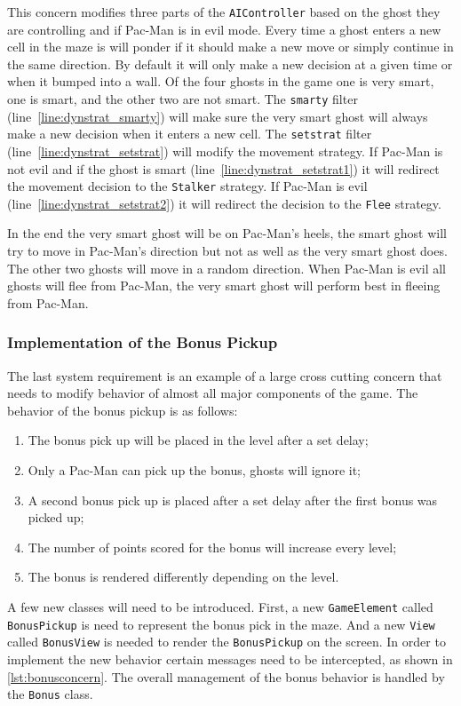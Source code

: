 This concern modifies three parts of the \lstinline|AIController| based on the ghost they are controlling and if Pac-Man is in evil mode. Every time a ghost enters a new cell in the maze is will ponder if it should make a new move or simply continue in the same direction. By default it will only make a new decision at a given time or when it bumped into a wall. Of the four ghosts in the game one is very smart, one is smart, and the other two are not smart. 
The \lstinline|smarty| filter (line~\ref{line:dynstrat_smarty}) will make sure the very smart ghost will always make a new decision when it enters a new cell. The \lstinline|setstrat| filter (line~\ref{line:dynstrat_setstrat}) will modify the movement strategy. If Pac-Man is not evil and if the ghost is smart (line~\ref{line:dynstrat_setstrat1}) it will redirect the movement decision to the \lstinline|Stalker| strategy. If Pac-Man is evil (line~\ref{line:dynstrat_setstrat2}) it will redirect the decision to the \lstinline|Flee| strategy.

In the end the very smart ghost will be on Pac-Man's heels, the smart ghost will try to move in Pac-Man's direction but not as well as the very smart ghost does. The other two ghosts will move in a random direction. When Pac-Man is evil all ghosts will flee from Pac-Man, the very smart ghost will perform best in fleeing from Pac-Man.

\subsubsection{Implementation of the Bonus Pickup}

The last system requirement is an example of a large cross cutting concern that needs to modify behavior of almost all major components of the game.
The behavior of the bonus pickup is as follows:
\begin{enumerate}[noitemsep]
	\samepage
	\item The bonus pick up will be placed in the level after a set delay;
	\item Only a Pac-Man can pick up the bonus, ghosts will ignore it;
	\item A second bonus pick up is placed after a set delay after the first bonus was picked up;
	\item The number of points scored for the bonus will increase every level;
	\item The bonus is rendered differently depending on the level.
\end{enumerate}
A few new classes will need to be introduced. First, a new \lstinline|GameElement| called \lstinline|BonusPickup| is need to represent the bonus pick in the maze. And a new \lstinline|View| called \lstinline|BonusView| is needed to render the \lstinline|BonusPickup| on the screen.
In order to implement the new behavior certain messages need to be intercepted, as shown in \autoref{lst:bonusconcern}. The overall management of the bonus behavior is handled by the \lstinline|Bonus| class.

